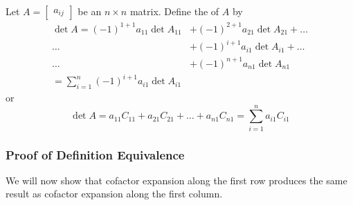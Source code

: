 \documentclass{ximera}
\begin{document}
\begin{definition}\label{def:firstcolexpansion1}  Let $A=\begin{bmatrix}a_{ij}\end{bmatrix}$ be an $n\times n$ matrix.  Define the  of $A$ by
\begin{align*}\det{A}=(-1)^{1+1}a_{11}\det{A_{11}}&+(-1)^{2+1}a_{21}\det{A_{21}}+\ldots \\
\ldots &+(-1)^{i+1}a_{i1}\det{A_{i1}}+\ldots \\
\ldots &+(-1)^{n+1}a_{n1}\det{A_{n1}}\\
=\sum_{i=1}^n(-1)^{i+1}a_{i1}\det{A_{i1}}
\end{align*}
or
$$\det{A}=a_{11}C_{11}+a_{21}C_{21}+\ldots +a_{n1}C_{n1}=\sum_{i=1}^n a_{i1}C_{i1}$$
\end{definition}

\subsubsection*{Proof of Definition Equivalence}
We will now show that cofactor expansion along the first row produces the same result as cofactor expansion along the first column.
\end{document}
